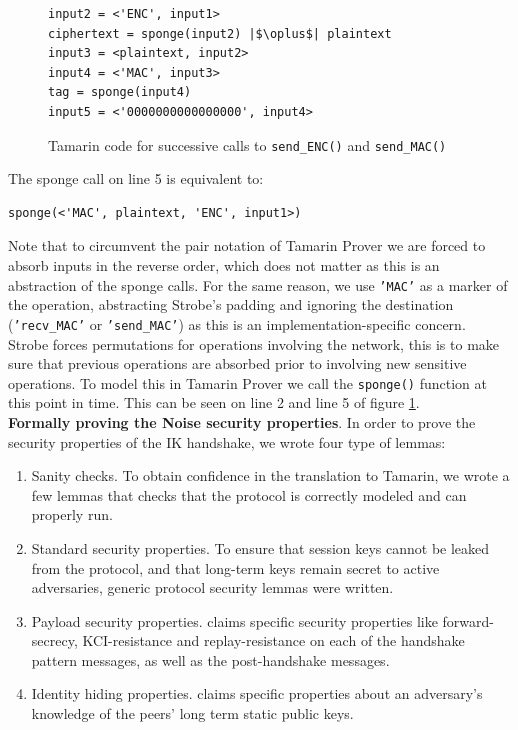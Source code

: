 \documentclass{article}
\begin{document}
\begin{figure}[H]
\begin{verbatim}
input2 = <'ENC', input1>
ciphertext = sponge(input2) |$\oplus$| plaintext
input3 = <plaintext, input2>
input4 = <'MAC', input3>
tag = sponge(input4)
input5 = <'0000000000000000', input4>
\end{verbatim}
\vspace*{-4mm}
\caption{Tamarin code for successive calls to \texttt{send_ENC()} and \texttt{send_MAC()}}
\label{fig:tamarin}
\end{figure}

The sponge call on line 5 is equivalent to:

\begin{verbatim}
sponge(<'MAC', plaintext, 'ENC', input1>)
\end{verbatim}

Note that to circumvent the pair notation of Tamarin Prover we are forced to absorb inputs in the reverse order, which does not matter as this is an abstraction of the sponge calls. For the same reason, we use \texttt{'MAC'} as a marker of the operation, abstracting Strobe's padding and ignoring the destination (\texttt{'recv_MAC'} or \texttt{'send_MAC'}) as this is an implementation-specific concern.\\

Strobe forces permutations for operations involving the network, this is to make sure that previous operations are absorbed prior to involving new sensitive operations. To model this in Tamarin Prover we call the \texttt{sponge()} function at this point in time. This can be seen on line 2 and line 5 of figure \ref{fig:tamarin}.\\

\textbf{Formally proving the Noise security properties}. In order to prove the security properties of the IK handshake, we wrote four type of lemmas:

\begin{enumerate}
    \item Sanity checks. To obtain confidence in the translation to Tamarin, we wrote a few lemmas that checks that the protocol is correctly modeled and can properly run.
    \item Standard security properties. To ensure that session keys cannot be leaked from the protocol, and that long-term keys remain secret to active adversaries, generic protocol security lemmas were written. 
    \item Payload security properties. \cite[Section 7.7 of the Noise Protocol Framework]{noise} claims specific security properties like forward-secrecy, KCI-resistance and replay-resistance on each of the handshake pattern messages, as well as the post-handshake messages.
    \item Identity hiding properties. \cite[Section 7.8 of the Noise Protocol Framework]{noise} claims specific properties about an adversary's knowledge of the peers' long term static public keys.
\end{enumerate}
\end{document}
